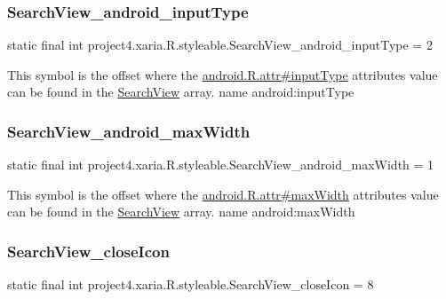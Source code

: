 \subsubsection{\texorpdfstring{Search\+View\+\_\+android\+\_\+input\+Type}{SearchView\_android\_inputType}}
{\footnotesize\ttfamily static final int project4.\+xaria.\+R.\+styleable.\+Search\+View\+\_\+android\+\_\+input\+Type = 2\hspace{0.3cm}{\ttfamily [static]}}

This symbol is the offset where the \hyperlink{}{android.\+R.\+attr\#input\+Type} attribute\textquotesingle{}s value can be found in the \hyperlink{classproject4_1_1xaria_1_1R_1_1styleable_a6308d960f6e1e05e5316efa4904fedfc}{Search\+View} array.  name android\+:input\+Type \mbox{\label{classproject4_1_1xaria_1_1R_1_1styleable_a3639cb45230c4e71f0cc02947e9eda85}} 
\subsubsection{\texorpdfstring{Search\+View\+\_\+android\+\_\+max\+Width}{SearchView\_android\_maxWidth}}
{\footnotesize\ttfamily static final int project4.\+xaria.\+R.\+styleable.\+Search\+View\+\_\+android\+\_\+max\+Width = 1\hspace{0.3cm}{\ttfamily [static]}}

This symbol is the offset where the \hyperlink{}{android.\+R.\+attr\#max\+Width} attribute\textquotesingle{}s value can be found in the \hyperlink{classproject4_1_1xaria_1_1R_1_1styleable_a6308d960f6e1e05e5316efa4904fedfc}{Search\+View} array.  name android\+:max\+Width \mbox{\label{classproject4_1_1xaria_1_1R_1_1styleable_a5a61b07ff3f067c74cabaac20104da1b}} 
\subsubsection{\texorpdfstring{Search\+View\+\_\+close\+Icon}{SearchView\_closeIcon}}
{\footnotesize\ttfamily static final int project4.\+xaria.\+R.\+styleable.\+Search\+View\+\_\+close\+Icon = 8\hspace{0.3cm}{\ttfamily [static]}}

